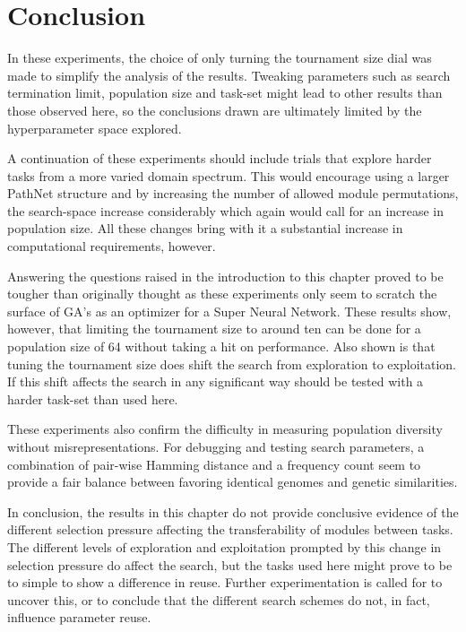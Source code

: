 \section{Conclusion}
In these experiments, the choice of only turning the tournament size dial was made to simplify the analysis of the results. Tweaking parameters such as search termination limit, population size and  task-set might lead to other results than those observed here, so the conclusions drawn are  ultimately limited by the hyperparameter space explored. 

A continuation of these experiments should include trials that explore harder tasks from a more varied domain spectrum. This would encourage using a larger PathNet structure and by increasing the number of allowed module permutations, the search-space increase considerably which again would call for an increase in population size. All these changes bring with it a substantial increase in computational requirements, however.

Answering the questions raised in the introduction to this chapter proved to be tougher than originally thought as these experiments only seem to scratch the surface of GA's as an optimizer for a Super Neural Network. These results show, however, that limiting the tournament size to around ten can be done for a population size of 64 without taking a hit on performance. Also shown is that tuning the tournament size does shift the search from exploration to exploitation. If this shift affects the search in any significant way should be tested with a harder task-set than used here. 

These experiments also confirm the difficulty in measuring population diversity without misrepresentations. For debugging and testing search parameters, a combination of pair-wise Hamming distance and a frequency count seem to provide a fair balance between favoring identical genomes and genetic similarities.  

In conclusion, the results in this chapter do not provide conclusive evidence of the different selection pressure affecting the transferability of modules between tasks. The different levels of exploration and exploitation prompted by this change in selection pressure do affect the search, but the tasks used here might prove to be to simple to show a difference in reuse. Further experimentation is called for to uncover this, or to conclude that the different search schemes do not, in fact, influence parameter reuse.
